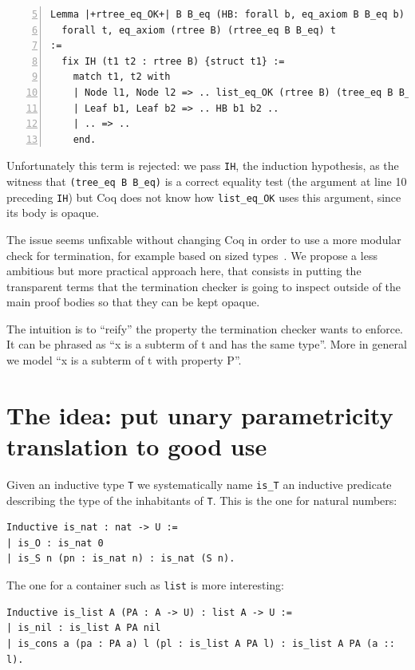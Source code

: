 \documentclass[a4paper,UKenglish,cleveref, autoref]{lipics-v2019}
\begin{document}
\begin{lstlisting}[numbers=left,firstnumber=5]
Lemma |+rtree_eq_OK+| B B_eq (HB: forall b, eq_axiom B B_eq b) :
  forall t, eq_axiom (rtree B) (rtree_eq B B_eq) t
:= 
  fix IH (t1 t2 : rtree B) {struct t1} :=
    match t1, t2 with
    | Node l1, Node l2 => .. list_eq_OK (rtree B) (tree_eq B B_eq) IH l1 l2 ..
    | Leaf b1, Leaf b2 => .. HB b1 b2 ..
    | .. => ..
    end.
\end{lstlisting}

\noindent
Unfortunately this term is rejected: we
pass \lstinline+IH+, the induction hypothesis, as the
witness that \lstinline+(tree_eq B B_eq)+ is a correct equality test
(the argument at line 10 preceding \lstinline+IH+) but Coq does not
know how 
\lstinline+list_eq_OK+ uses this argument, since its body is opaque.

The issue seems unfixable without changing Coq in order to use a more
modular check for termination, for example based on sized
types~\cite{DBLP:journals/lmcs/Abel08}.
We propose a less ambitious but more practical approach here, that
consists in putting the transparent terms that the termination checker
is going to inspect outside of the main proof bodies so that they can be 
kept opaque.

The intuition is to ``reify'' the property the termination checker wants
to enforce. It can be phrased as ``x is a subterm of t and has the same
type''. More in general we model ``x is a subterm of t with property
P''.

\section{The idea: put unary parametricity translation to good use}
\label{sec:idea}

Given an inductive type \lstinline+T+ we systematically name \lstinline+is_T+
an inductive predicate describing the type of the inhabitants of
\lstinline+T+. This is the one for natural numbers:

\begin{lstlisting}
Inductive is_nat : nat -> U :=
| is_O : is_nat 0
| is_S n (pn : is_nat n) : is_nat (S n).
\end{lstlisting}

\noindent
The one for a container such as \lstinline+list+ is more interesting:

\begin{lstlisting}
Inductive is_list A (PA : A -> U) : list A -> U :=
| is_nil : is_list A PA nil
| is_cons a (pa : PA a) l (pl : is_list A PA l) : is_list A PA (a :: l).
\end{lstlisting}
\end{document}
